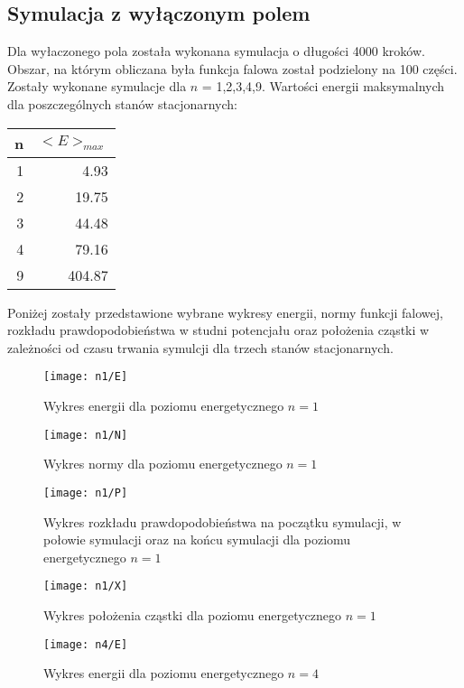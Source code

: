 \documentclass[a4paper,10pt]{article}
\begin{document}
	\subsection{Symulacja z wyłączonym polem}
	Dla wyłaczonego pola została wykonana symulacja o długości 4000 kroków. Obszar, na którym obliczana była funkcja falowa został podzielony na 100 części. Zostały wykonane symulacje dla $n$ = 1,2,3,4,9. Wartości energii maksymalnych dla poszczególnych stanów stacjonarnych:
	\begin{center}
		\begin{tabular}{r|r}
			n & $<E>_{max}$\\
			\hline
			\hline
			1 & 4.93 \\
			2 & 19.75 \\
			3 & 44.48 \\
			4 & 79.16 \\
			9 & 404.87
		\end{tabular}
	\end{center}
	Poniżej zostały przedstawione wybrane wykresy energii, normy funkcji falowej, rozkładu prawdopodobieństwa w studni potencjału oraz położenia cząstki w zależności od czasu trwania symulcji dla trzech stanów stacjonarnych.
	\begin{figure}[h]
	    \centering
	    \texttt{[image: n1/E]}
	    \caption{Wykres energii dla poziomu energetycznego $n = 1$}
		\label{n1e}
	\end{figure}		

	\begin{figure}[h]
	    \centering
	    \texttt{[image: n1/N]}
	    \caption{Wykres normy dla poziomu energetycznego $n = 1$}
		\label{n1n}
	\end{figure}

	\begin{figure}[h]
	    \centering
	    \texttt{[image: n1/P]}
	    \caption{Wykres rozkładu prawdopodobieństwa na początku symulacji, w połowie symulacji oraz na końcu symulacji dla poziomu energetycznego $n = 1$}
		\label{n1p}
	\end{figure}

	\begin{figure}[h]
	    \centering
	    \texttt{[image: n1/X]}
	    \caption{Wykres położenia cząstki dla poziomu energetycznego $n = 1$}
		\label{n1x}
	\end{figure}

	\begin{figure}[h]
	    \centering
	    \texttt{[image: n4/E]}
	    \caption{Wykres energii dla poziomu energetycznego $n = 4$}
		\label{n4e}
	\end{figure}		
\end{document}
